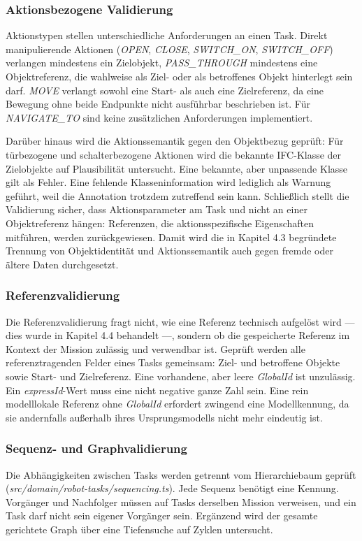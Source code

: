 \subsubsection{Aktionsbezogene Validierung}
Aktionstypen stellen unterschiedliche Anforderungen an einen Task. Direkt manipulierende Aktionen
(\textit{OPEN}, \textit{CLOSE}, \textit{SWITCH\_ON}, \textit{SWITCH\_OFF}) verlangen mindestens ein
Zielobjekt, \textit{PASS\_THROUGH} mindestens eine Objektreferenz, die wahlweise als Ziel- oder als
betroffenes Objekt hinterlegt sein darf. \textit{MOVE} verlangt sowohl eine Start- als auch eine
Zielreferenz, da eine Bewegung ohne beide Endpunkte nicht ausführbar beschrieben ist. Für
\textit{NAVIGATE\_TO} sind keine zusätzlichen Anforderungen implementiert.

Darüber hinaus wird die Aktionssemantik gegen den Objektbezug geprüft: Für türbezogene und
schalterbezogene Aktionen wird die bekannte IFC-Klasse der Zielobjekte auf Plausibilität untersucht.
Eine bekannte, aber unpassende Klasse gilt als Fehler. Eine fehlende Klasseninformation wird
lediglich als Warnung geführt, weil die Annotation trotzdem zutreffend sein kann. Schließlich stellt
die Validierung sicher, dass Aktionsparameter am Task und nicht an einer Objektreferenz hängen:
Referenzen, die aktionsspezifische Eigenschaften mitführen, werden zurückgewiesen. Damit wird die in
Kapitel 4.3 begründete Trennung von Objektidentität und Aktionssemantik auch gegen fremde oder
ältere Daten durchgesetzt.

\subsubsection{Referenzvalidierung}
Die Referenzvalidierung fragt nicht, wie eine Referenz technisch aufgelöst wird — dies wurde in
Kapitel 4.4 behandelt —, sondern ob die gespeicherte Referenz im Kontext der Mission zulässig und
verwendbar ist. Geprüft werden alle referenztragenden Felder eines Tasks gemeinsam: Ziel- und
betroffene Objekte sowie Start- und Zielreferenz. Eine vorhandene, aber leere \textit{GlobalId} ist
unzulässig. Ein \textit{expressId}-Wert muss eine nicht negative ganze Zahl sein. Eine rein
modelllokale Referenz ohne \textit{GlobalId} erfordert zwingend eine Modellkennung, da sie
andernfalls außerhalb ihres Ursprungsmodells nicht mehr eindeutig ist.

\subsubsection{Sequenz- und Graphvalidierung}
Die Abhängigkeiten zwischen Tasks werden getrennt vom Hierarchiebaum geprüft
(\textit{src/domain/robot-tasks/sequencing.ts}). Jede Sequenz benötigt eine Kennung. Vorgänger und
Nachfolger müssen auf Tasks derselben Mission verweisen, und ein Task darf nicht sein eigener
Vorgänger sein. Ergänzend wird der gesamte gerichtete Graph über eine Tiefensuche auf Zyklen
untersucht.

